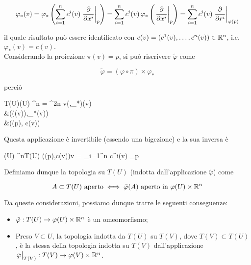 \begin{equation}
	\varphi_{*}(v) = \varphi_{*} \left( \sum_{i=1}^{n} c^{i}(v) \eval{ \pdv{x^{i}} }_{p} \right) %
	= \sum_{i=1}^{n} c^{i}(v) \, \varphi_{*} \left( \eval{ \pdv{x^{i}} }_{p} \right) %
	= \sum_{i=1}^{n} c^{i}(v) \eval{ \pdv{r^{i}} }_{\varphi(p)}
\end{equation}

il quale risultato può essere identificato con $ c(v) = (c^{1}(v),\dots,c^{n}(v)) \in \mathbb{R}^{n} $, i.e. $ \varphi_{*}(v) = c(v) $. \\
Considerando la proiezione $ \pi(v) = p $, si può riscrivere $ \tilde{\varphi} $ come

\begin{equation}
	\tilde{\varphi} = (\varphi \circ \pi) \times \varphi_{*}
\end{equation}

perciò

\map{\tilde{\varphi}}
	{T(U)}{\varphi(U) \times \R^{n} = \R^{2n}}
	{v}{(\varphi \circ \pi,\varphi_{*})(v) \\
		&\mapsto (\varphi(\pi(v)),\varphi_{*}(v)) \\
		&\mapsto (\varphi(p), c(v))
		}

Questa applicazione è invertibile (essendo una bigezione) e la sua inversa è

	{\varphi(U) \times \R^{n}}{T(U)}
	{(\varphi(p),c(v))}{v = \sum_{i=1}^{n} c^{i}(v) _{p}}

Definiamo dunque la topologia su $ T(U) $ (indotta dall'applicazione $ \tilde{\varphi} $) come

\begin{equation}
	A \subset T(U) \text{ aperto} \iff \tilde{\varphi}(A) \text{ aperto in } \varphi(U) \times \mathbb{R}^{n}
\end{equation}

Da queste considerazioni, possiamo dunque trarre le seguenti conseguenze:

\begin{itemize}
	\item $ \tilde{\varphi} : T(U) \to \varphi(U) \times \mathbb{R}^{n} $ è un omeomorfismo;
	
	\item Preso $ V \subset U $, la topologia indotta da $ T(U) $ su $ T(V) $, dove $ T(V) \subset T(U) $, è la stessa della topologia indotta su $ T(V) $ dall'applicazione $ \eval{\tilde{\varphi}}_{T(V)} : T(V) \to \varphi(V) \times \R^{n} $.
\end{itemize}

